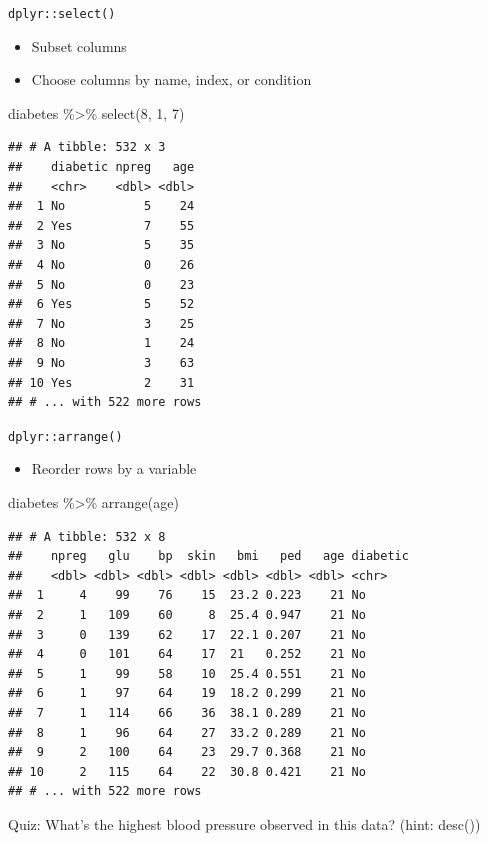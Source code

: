 \documentclass[
  ignorenonframetext,
]{beamer}
\newenvironment{Shaded}{\begin{snugshade}}{\end{snugshade}}
\newcommand{\DecValTok}[1]{\textcolor[rgb]{0.00,0.00,0.81}{#1}}
\newcommand{\FunctionTok}[1]{\textcolor[rgb]{0.00,0.00,0.00}{#1}}
\newcommand{\NormalTok}[1]{#1}
\newcommand{\SpecialCharTok}[1]{\textcolor[rgb]{0.00,0.00,0.00}{#1}}
\providecommand{\tightlist}{%
  \setlength{\itemsep}{0pt}\setlength{\parskip}{0pt}}
\begin{document}
\begin{frame}[fragile]{\texttt{dplyr::select()}}
\protect\hypertarget{dplyrselect-1}{}
\begin{itemize}
\tightlist
\item
  Subset columns
\item
  Choose columns by name, index, or condition
\end{itemize}

\begin{Shaded}
\begin{Highlighting}[]
\NormalTok{diabetes }\SpecialCharTok{\%\textgreater{}\%} 
  \FunctionTok{select}\NormalTok{(}\DecValTok{8}\NormalTok{, }\DecValTok{1}\NormalTok{, }\DecValTok{7}\NormalTok{)}
\end{Highlighting}
\end{Shaded}

\begin{verbatim}
## # A tibble: 532 x 3
##    diabetic npreg   age
##    <chr>    <dbl> <dbl>
##  1 No           5    24
##  2 Yes          7    55
##  3 No           5    35
##  4 No           0    26
##  5 No           0    23
##  6 Yes          5    52
##  7 No           3    25
##  8 No           1    24
##  9 No           3    63
## 10 Yes          2    31
## # ... with 522 more rows
\end{verbatim}
\end{frame}

\begin{frame}[fragile]{\texttt{dplyr::arrange()}}
\protect\hypertarget{dplyrarrange}{}
\begin{itemize}
\tightlist
\item
  Reorder rows by a variable
\end{itemize}

\begin{Shaded}
\begin{Highlighting}[]
\NormalTok{diabetes }\SpecialCharTok{\%\textgreater{}\%} \FunctionTok{arrange}\NormalTok{(age)}
\end{Highlighting}
\end{Shaded}

\begin{verbatim}
## # A tibble: 532 x 8
##    npreg   glu    bp  skin   bmi   ped   age diabetic
##    <dbl> <dbl> <dbl> <dbl> <dbl> <dbl> <dbl> <chr>   
##  1     4    99    76    15  23.2 0.223    21 No      
##  2     1   109    60     8  25.4 0.947    21 No      
##  3     0   139    62    17  22.1 0.207    21 No      
##  4     0   101    64    17  21   0.252    21 No      
##  5     1    99    58    10  25.4 0.551    21 No      
##  6     1    97    64    19  18.2 0.299    21 No      
##  7     1   114    66    36  38.1 0.289    21 No      
##  8     1    96    64    27  33.2 0.289    21 No      
##  9     2   100    64    23  29.7 0.368    21 No      
## 10     2   115    64    22  30.8 0.421    21 No      
## # ... with 522 more rows
\end{verbatim}

Quiz: What's the highest blood pressure observed in this data? (hint:
desc())
\end{frame}
\end{document}
